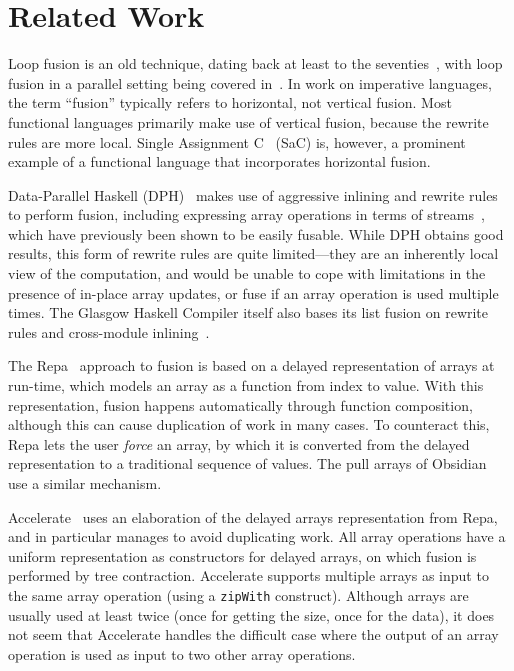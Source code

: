 \section{Related Work}
\label{sec:related-work-fusion}

Loop fusion is an old technique, dating back at least to the
seventies~\cite{cheatham1977programming}, with loop fusion in a
parallel setting being covered in~\cite{midki1990issues}. In work on
imperative languages, the term ``fusion'' typically refers to
horizontal, not vertical fusion.  Most functional languages primarily
make use of vertical fusion, because the rewrite rules are more local.
Single Assignment C~\cite{grelck2006sac} (SaC) is, however, a
prominent example of a functional language that incorporates
horizontal fusion.

Data-Parallel Haskell (DPH)~\cite{Chak06DPH} makes use of aggressive
inlining and rewrite rules to perform fusion, including expressing
array operations in terms of streams~\cite{coutts2007rewriting}, which
have previously been shown to be easily fusable.  While DPH obtains
good results, this form of rewrite rules are quite limited---they are
an inherently local view of the computation, and would be unable to
cope with limitations in the presence of in-place array updates, or
fuse if an array operation is used multiple times.  The Glasgow
Haskell Compiler itself also bases its list fusion on rewrite rules
and cross-module inlining~\cite{jones2001playing}.

The Repa~\cite{keller2010regular} approach to fusion is based on a
delayed representation of arrays at run-time, which models an array as
a function from index to value.  With this representation, fusion
happens automatically through function composition, although this can
cause duplication of work in many cases.  To counteract this, Repa
lets the user \textit{force} an array, by which it is converted from
the delayed representation to a traditional sequence of values.  The
pull arrays of Obsidian~\cite{claessen2012expressive} use a similar
mechanism.

Accelerate~\cite{mcdonell2013optimising} uses an elaboration of the
delayed arrays representation from Repa, and in particular manages to
avoid duplicating work.  All array operations have a uniform
representation as constructors for delayed arrays, on which fusion is
performed by tree contraction.  Accelerate supports multiple arrays as
input to the same array operation (using a \texttt{zipWith}
construct).  Although arrays are usually used at least twice (once for
getting the size, once for the data), it does not seem that Accelerate
handles the difficult case where the output of an array operation is
used as input to two other array operations.

